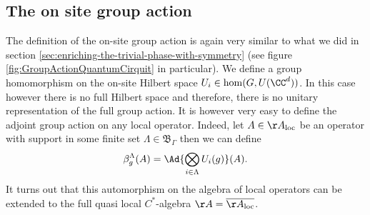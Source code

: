 \subsection{The on site group action}
The definition of the on-site group action is again very similar to what we did in section \ref{sec:enriching-the-trivial-phase-with-symmetry} (see figure \ref{fig:GroupActionQuantumCirquit} in particular). We define a group homomorphism on the on-site Hilbert space $U_i\in\hom(G,U(\CC^d))$. In this case however there is no full Hilbert space and therefore, there is no unitary representation of the full group action. It is however very easy to define the adjoint group action on any local operator. Indeed, let $A\in\AA_{\text{loc}}$ be an operator with support in some finite set $\Lambda\in\mathfrak{B}_{\Gamma}$ then we can define
\begin{equation}
\beta^\Lambda_{g}(A)=\Ad{\bigotimes_{i\in\Lambda}U_i(g)}(A).
\end{equation}
It turns out that this automorphism on the algebra of local operators can be extended to the full quasi local $C^*$-algebra $\AA=\overline{\AA_{\text{loc}}}$.
